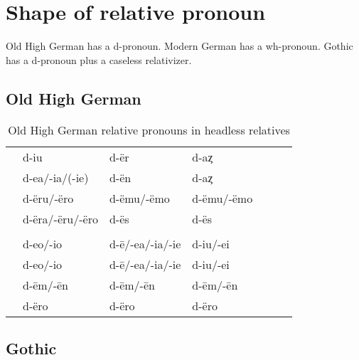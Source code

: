   \section{Shape of relative pronoun}
Old High German has a d-pronoun. Modern German has a wh-pronoun. Gothic has a d-pronoun plus a caseless relativizer.


\subsection{Old High German}

\begin{table}[h]\label{tbl:paradigmohg}
	\center
	\caption {Old High German relative pronouns in headless relatives}
	\begin{minipage}{0.85\linewidth}
		\begin{tabularx}{\textwidth}{c *{6}{Y}}
		\toprule
			&           &            &     \\
		\midrule
		 & d-iu             & d-ër       	     & d-aȥ				\\
			& d-ea/-ia/(-ie)   & d-ën				       & d-aȥ		    \\
			& d-ëru/-ëro	     & d-ëmu/-ëmo	       & d-ëmu/-ëmo \\
     & d-ëra/-ëru/-ëro  & d-ës              & d-ës       \\
		\bottomrule
    \toprule
    	&           &            &     \\
    \midrule
     & d-eo/-io         &  d-ē/-ea/-ia/-ie  & d-iu/-ei   \\
     & d-eo/-io         &  d-ē/-ea/-ia/-ie  & d-iu/-ei   \\
     & d-ēm/-ēn         &  d-ēm/-ēn         & d-ēm/-ēn   \\
     & d-ëro            &  d-ëro            & d-ëro      \\
    \bottomrule
		\end{tabularx}
	\end{minipage}
\end{table}


\subsection{Gothic}

